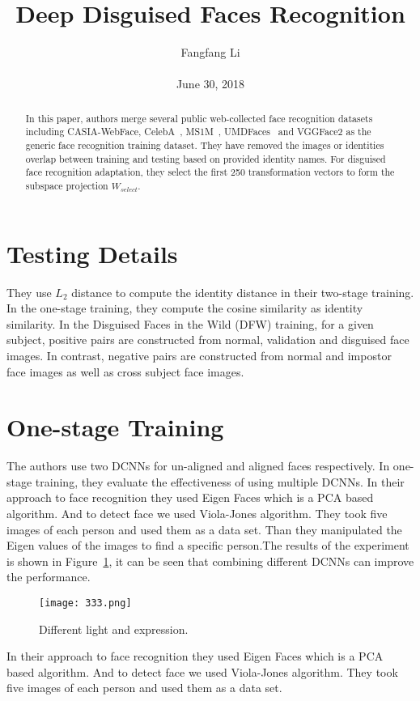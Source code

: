\documentclass[10pt,twocolumn,letterpaper]{article}
\begin{document}
\title{\textbf{Deep Disguised Faces Recognition}}
\author{Fangfang Li\\\\June 30, 2018}
\maketitle
\begin{abstract}
In this paper, authors merge several public web-collected face recognition datasets including CASIA-WebFace, CelebA~\cite{He2005Face}, MS1M~\cite{Wolf2011Face}, UMDFaces~\cite{Wagner2009Towards} and VGGFace2 as the generic face recognition training dataset. They have removed the images or identities overlap between training and testing based on provided identity names. For disguised face recognition adaptation, they select the first 250 transformation vectors to form the subspace projection $W_{select}$.
\end{abstract}
\section{Testing Details}
They use $L_2$ distance to compute the identity distance in their two-stage training. In the one-stage training, they compute the cosine similarity as identity similarity. In the Disguised Faces in the Wild (DFW) training, for a given subject, positive pairs are constructed from normal, validation and disguised face images. In contrast, negative pairs are constructed from normal and impostor face images as well as cross subject face images.
\section{One-stage Training}
The authors use two DCNNs for un-aligned and aligned faces respectively. In one-stage training, they evaluate the effectiveness of using multiple DCNNs. In their approach to face recognition they used Eigen Faces which is a PCA based algorithm. And to detect face we used
Viola-Jones algorithm. They took five images of each person and used them as a data set. Than they manipulated the Eigen values of the images to find a specific person.The results of the experiment is shown in Figure~\ref{fig:1}, it can be seen that combining different DCNNs can improve the performance.
\begin{figure}[htbp]
\begin{center}
\texttt{[image: 333.png]}
\end{center}
\caption{ Different light and expression.}
\label{fig:1}
\end{figure}
In their approach to face recognition they used Eigen Faces which is a PCA based algorithm. And to detect face we used
Viola-Jones algorithm. They took five images of each person and used them as a data set.


{\small


}
\end{document}
